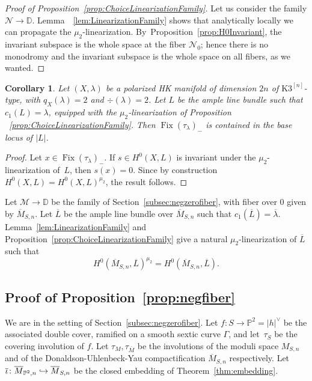 \documentclass[11pt]{article}
\newcommand\hto{\mathrel{\lhook\joinrel\to}}
\newcommand{\HK}{\textup{HK}\xspace}
\newcommand{\DD}{{\mathbb D}}
\newcommand{\PP}{{\mathbb P}}\let\P\PP
\newcommand\cM{\mathcal{M}}
\DeclareMathOperator{\Fix}{Fix}
\let\hra\hto
\let\ov\overline
\newtheorem{coro}[lemm]{Corollary}
\theoremstyle{definition}
\begin{document}
\begin{proof}[Proof of Proposition~\ref{prop:ChoiceLinearizationFamily}]
Let us consider the family $\mathcal{N}\to\DD$.
Lemma~~\ref{lem:LinearizationFamily} shows that analytically locally we can propagate the $\mu_2$-linearization. By~Proposition~\ref{prop:H0Invariant}, the invariant subspace is the whole space at the fiber $\mathcal{N}_0$; hence there is no monodromy and the invariant subspace is the whole space on all fibers, as we wanted.
\end{proof}

\begin{coro}\label{coro:negbase}
Let $(X,\lambda)$ be a polarized \HK manifold of dimension $2n$ of $\mathrm{K3}^{[n]}$-type, with $q_X(\lambda)=2$ and $\div(\lambda)=2$.
Let $L$ be the ample line bundle such that $c_1(L)=\lambda$, equipped with the $\mu_2$-linearization of Proposition ~\ref{prop:ChoiceLinearizationFamily}.
Then $\Fix(\tau_{\lambda})_{-}$ is contained in the base locus of $|L|$.
\end{coro}

\begin{proof}
Let $x\in\Fix(\tau_{\lambda})_{-}$. If $s\in H^0(X,L)$ is invariant under the $\mu_2$-linearization of~$L$, then $s(x)=0$.
Since by construction $H^0(X,L)=H^0(X,L)^{\mu_2}$, the result follows.
\end{proof}

Let $\cM\to\DD$ be the family of Section~\ref{subsec:negzerofiber}, with fiber over $0$ given by $\overline{M}_{S,n}$. Let $\ov{L}$ be the ample line bundle over $\overline{M}_{S,n}$ such that $c_1(\ov{L})=\ov{\lambda}$.
Lemma~\ref{lem:LinearizationFamily} and Proposition~\ref{prop:ChoiceLinearizationFamily} give a natural $\mu_2$-linearization of $\ov{L}$ such that
\[
H^0(\overline{M}_{S,n},\ov{L})^{\mu_2} = H^0(\overline{M}_{S,n},\ov{L}).
\]

\subsection{Proof of Proposition~\ref{prop:negfiber}}\label{subsec:LinearizationDegree2}

We are in the setting of Section~\ref{subsec:negzerofiber}.
Let $f\colon S\to \P^2=|h|^{\vee}$ be the associated double cover, ramified on a smooth sextic curve $\mathsf{\Gamma}$, and let~$\tau_S$ be the covering involution of $f$.
Let $\tau_M,\tau_{\ov{M}}$ be the involutions of the moduli space $M_{S,n}$ and of the Donaldson-Uhlenbeck-Yau compactification $\ov{M}_{S,n}$ respectively. Let $\ov{\iota}\colon \ov{M}_{\PP^2,n}\hra \ov{M}_{S,n}$ be the closed embedding of Theorem~\ref{thm:embedding}.
\end{document}
